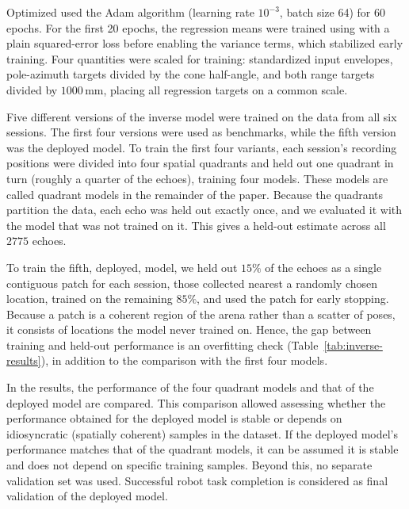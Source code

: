 \documentclass[11pt]{article}
\begin{document}
Optimized used the Adam algorithm (learning rate $10^{-3}$, batch size 64) for 60 epochs. For the first 20 epochs,  the regression means were trained using with a plain squared-error loss before enabling the variance terms, which stabilized early training. Four quantities were scaled for training: standardized input envelopes, pole-azimuth targets divided by the cone half-angle, and both range targets divided by $1000$\,mm, placing all regression targets on a common scale. %

Five different versions of the inverse model were trained on the data from all six sessions. The first four versions were used as benchmarks, while the fifth version was the deployed model. To train the first four variants, each session's recording positions were divided into four spatial quadrants and held out one quadrant in turn (roughly a quarter of the echoes), training four models. These models are called quadrant models in the remainder of the paper. Because the quadrants partition the data, each echo was held out exactly once, and we evaluated it with the model that was not trained on it. This gives a held-out estimate across all $2775$ echoes.%

To train the fifth, deployed, model, we held out $15\%$ of the echoes as a single contiguous patch for each session, those collected nearest a randomly chosen location, trained on the remaining $85\%$, and used the patch for early stopping. Because a patch is a coherent region of the arena rather than a scatter of poses, it consists of locations the model never trained on. Hence, the gap between training and held-out performance is an overfitting check (Table~\ref{tab:inverse-results}), in addition to the comparison with the first four models.

In the results, the performance of the four quadrant models and that of the deployed model are compared. This comparison allowed assessing whether the performance obtained for the deployed model is stable or depends on idiosyncratic (spatially coherent) samples in the dataset. If the deployed model's performance matches that of the quadrant models, it can be assumed it is stable and does not depend on specific training samples. Beyond this, no separate validation set was used. Successful robot task completion is considered as final validation of the deployed model. 
\end{document}
